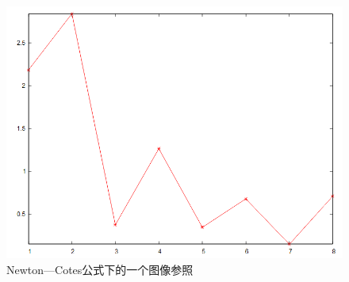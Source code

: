 \documentclass{xtupaper}
\begin{document}
\begin{figure}[htp]%
	\centering  %
	\includegraphics[scale=0.5]{NC2} 
	\caption{Newton—Cotes公式下的一个图像参照}  %
	\label{NC2}
	

\end{figure}
\end{document}
